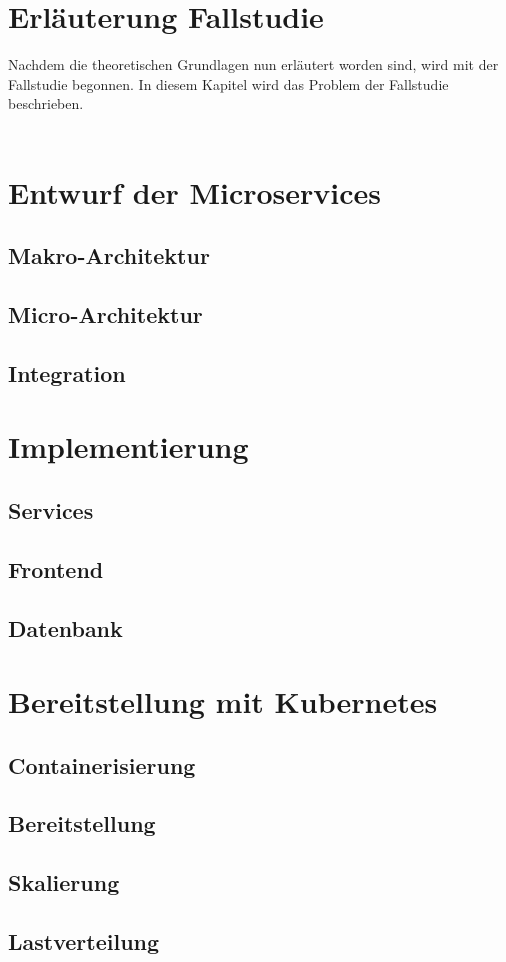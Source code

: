 \section{Erläuterung Fallstudie}

Nachdem die theoretischen Grundlagen nun erläutert worden sind, wird mit der Fallstudie begonnen. In diesem Kapitel wird das Problem der Fallstudie beschrieben. \\
\\


\section{Entwurf der Microservices}



\subsection{Makro-Architektur}

\subsection{Micro-Architektur}

\subsection{Integration}

\section{Implementierung}

\subsection{Services}

\subsection{Frontend}

\subsection{Datenbank}

\section{Bereitstellung mit Kubernetes}

\subsection{Containerisierung}

\subsection{Bereitstellung}

\subsection{Skalierung}

\subsection{Lastverteilung}


